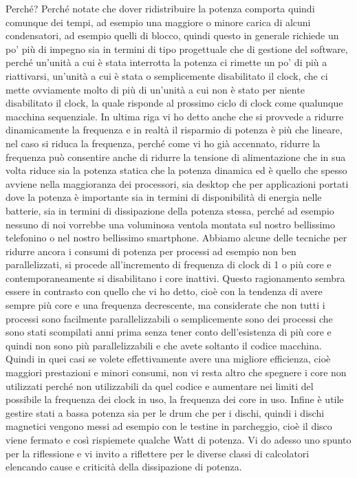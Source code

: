 Perché?
Perché notate che dover ridistribuire la potenza comporta quindi comunque dei tempi, ad esempio una maggiore o minore carica di alcuni condensatori, ad esempio quelli di blocco, quindi questo in generale richiede un po' più di impegno sia in termini di tipo progettuale che di gestione del software, perché un'unità a cui è stata interrotta la potenza ci rimette un po' di più a riattivarsi, un'unità a cui è stata o semplicemente disabilitato il clock, che ci mette ovviamente molto di più di un'unità a cui non è stato per niente disabilitato il clock, la quale risponde al prossimo ciclo di clock come qualunque macchina sequenziale.
In ultima riga vi ho detto anche che si provvede a ridurre dinamicamente la frequenza e in realtà il risparmio di potenza è più che lineare, nel caso si riduca la frequenza, perché come vi ho già accennato, ridurre la frequenza può consentire anche di ridurre la tensione di alimentazione che in sua volta riduce sia la potenza statica che la potenza dinamica ed è quello che spesso avviene nella maggioranza dei processori, sia desktop che per applicazioni portati dove la potenza è importante sia in termini di disponibilità di energia nelle batterie, sia in termini di dissipazione della potenza stessa, perché ad esempio nessuno di noi vorrebbe una voluminosa ventola montata sul nostro bellissimo telefonino o nel nostro bellissimo smartphone.
Abbiamo alcune delle tecniche per ridurre ancora i consumi di potenza per processi ad esempio non ben parallelizzati, si procede all'incremento di frequenza di clock di 1 o più core e contemporaneamente si disabilitano i core inattivi.
Questo ragionamento sembra essere in contrasto con quello che vi ho detto, cioè con la tendenza di avere sempre più core e una frequenza decrescente, ma considerate che non tutti i processi sono facilmente parallelizzabili o semplicemente sono dei processi che sono stati scompilati anni prima senza tener conto dell'esistenza di più core e quindi non sono più parallelizzabili e che avete soltanto il codice macchina.
Quindi in quei casi se volete effettivamente avere una migliore efficienza, cioè maggiori prestazioni e minori consumi, non vi resta altro che spegnere i core non utilizzati perché non utilizzabili da quel codice e aumentare nei limiti del possibile la frequenza dei clock in uso, la frequenza dei core in uso.
Infine è utile gestire stati a bassa potenza sia per le drum che per i dischi, quindi i dischi magnetici vengono messi ad esempio con le testine in parcheggio, cioè il disco viene fermato e così rispiemete qualche Watt di potenza.
Vi do adesso uno spunto per la riflessione e vi invito a riflettere per le diverse classi di calcolatori elencando cause e criticità della dissipazione di potenza.
